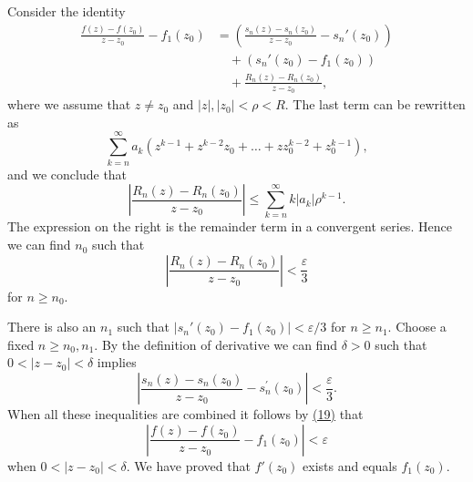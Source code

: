 Consider the identity
\begin{equation*}
\begin{aligned}
\frac{f(z)-f(z_0)}{z-z_0}-f_1(z_0)
&=\left(\frac{s_n(z)-s_n(z_0)}{z-z_0}-s_n'(z_0)\right)\\
&\quad+(s_n'(z_0)-f_1(z_0))\\
&\quad+\frac{R_n(z)-R_n(z_0)}{z-z_0},
\end{aligned}\tag{19}\label{eq:2.19}
\end{equation*}
where we assume that $z \neq z_0$ and $|z|, |z_0| < \rho < R$. The last term can be rewritten as
\begin{equation*}
\sum_ {k = n} ^ {\infty} a _ {k} (z ^ {k - 1} + z ^ {k - 2} z _ {0} + \dots + z z _ {0} ^ {k - 2} + z _ {0} ^ {k - 1}),
\end{equation*}
and we conclude that
\begin{equation*}
\left| \frac {R _ {n} (z) - R _ {n} (z _ {0})}{z - z _ {0}} \right| \leq \sum_ {k = n} ^ {\infty} k | a _ {k} | \rho^ {k - 1}.
\end{equation*}
The expression on the right is the remainder term in a convergent series. Hence we can find $n_{0}$ such that
\begin{equation*}
\left| \frac {R _ {n} (z) - R _ {n} (z _ {0})}{z - z _ {0}} \right| <   \frac {\varepsilon}{3}
\end{equation*}
for $n \geq n_0$.

There is also an $n_1$ such that $|s_n'(z_0) - f_1(z_0)| < \varepsilon / 3$ for $n \geq n_1$. Choose a fixed $n \geq n_0, n_1$. By the definition of derivative we can find $\delta > 0$ such that $0 < |z - z_0| < \delta$ implies
\begin{equation*}
\left| \frac {s _ {n} (z) - s _ {n} (z _ {0})}{z - z _ {0}} - s _ {n} ^ {\prime} (z _ {0}) \right| <   \frac {\varepsilon}{3}.
\end{equation*}
When all these inequalities are combined it follows by \hyperref[eq:2.19]{(19)} that
\begin{equation*}
\left| \frac {f (z) - f (z _ {0})}{z - z _ {0}} - f _ {1} (z _ {0}) \right| <   \varepsilon
\end{equation*}
when $0 < |z - z_0| < \delta$. We have proved that $f'(z_0)$ exists and equals $f_1(z_0)$.

